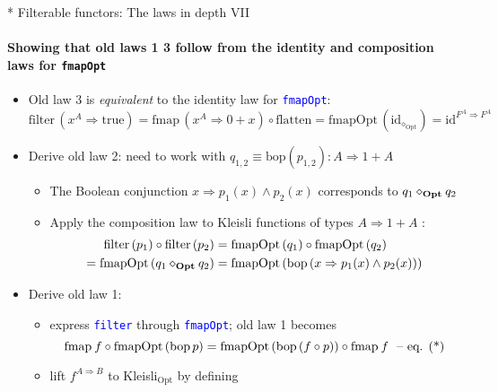 \documentclass[english]{beamer}
\begin{document}
\begin{frame}{{*} Filterable functors: The laws in depth VII}


\framesubtitle{Showing that old laws 1 \textendash{} 3 follow from the identity
and composition laws for \texttt{\footnotesize{}fmapOpt}}
\begin{itemize}
\item Old law 3 is \emph{equivalent} to the identity law for \texttt{\textcolor{blue}{\footnotesize{}fmapOpt}}:{\footnotesize{}
\[
\text{filter}\,(x^{A}\Rightarrow\text{true})=\text{fmap}\,(x^{A}\Rightarrow0+x)\circ\text{flatten}=\text{fmapOpt}\,(\text{id}_{\diamond_{\text{Opt}}})=\text{id}^{F^{A}\Rightarrow F^{A}}
\]
}{\footnotesize \par}
\item Derive old law 2: need to work with{\footnotesize{} $q_{1,2}\equiv\text{bop}\left(p_{1,2}\right):A\Rightarrow1+A$ }{\footnotesize \par}
\begin{itemize}
\item The Boolean conjunction {\footnotesize{}$x\Rightarrow p_{1}(x)\wedge p_{2}(x)$
}corresponds to {\footnotesize{}$q_{1}\diamond_{\text{\textbf{Opt}}}q_{2}$}{\footnotesize \par}
\item Apply the composition law to Kleisli functions of types {\footnotesize{}$A\Rightarrow1+A$
}:{\footnotesize{}
\begin{align*}
\text{filter}\left(p_{1}\right)\circ\text{filter}\left(p_{2}\right) & =\text{fmapOpt}\left(q_{1}\right)\circ\text{fmapOpt}\left(q_{2}\right)\\
=\text{fmapOpt}\left(q_{1}\diamond_{\text{\textbf{Opt}}}q_{2}\right) & =\text{fmapOpt}\left(\text{bop}\left(x\Rightarrow p_{1}(x)\wedge p_{2}(x)\right)\right)
\end{align*}
}{\footnotesize \par}
\end{itemize}
\item Derive old law 1:
\begin{itemize}
\item express \texttt{\textcolor{blue}{\footnotesize{}filter}} through \texttt{\textcolor{blue}{\footnotesize{}fmapOpt}};
old law 1 becomes{\footnotesize{}
\[
\text{fmap}\:f\circ\text{fmapOpt}\left(\text{bop}\,p\right)=\text{fmapOpt}\left(\text{bop}\left(f\circ p\right)\right)\circ\text{fmap}\:f\ \text{ \textendash\ eq. (*)}
\]
}{\footnotesize \par}
\item lift $f^{A\Rightarrow B}$ to Kleisli$_{\text{Opt}}$ by defining

\end{itemize}
\end{itemize}
\end{frame}
\end{document}
